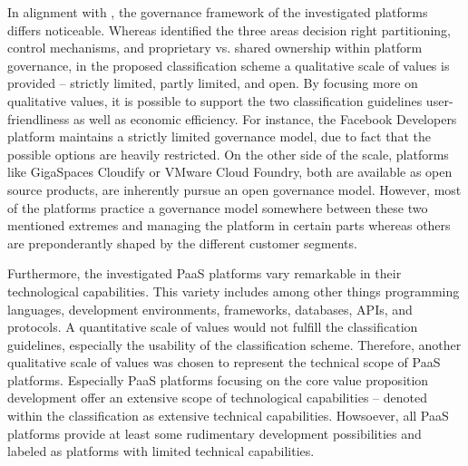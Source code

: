 In alignment with \citet{Tiwana2010}, the governance framework of the investigated platforms differs noticeable. Whereas \citet[pp. 679-681]{Tiwana2010} identified the three areas decision right partitioning, control mechanisms, and proprietary vs. shared ownership within platform governance, in the proposed classification scheme a qualitative scale of values is provided -- strictly limited, partly limited, and open. By focusing more on qualitative values, it is possible to support the two classification guidelines user-friendliness as well as economic efficiency. For instance, the Facebook Developers platform maintains a strictly limited governance model, due to fact that the possible options are heavily restricted. On the other side of the scale, platforms like GigaSpaces Cloudify or VMware Cloud Foundry, both are available as open source products, are inherently pursue an open governance model. However, most of the platforms practice a governance model somewhere between these two mentioned extremes and managing the platform in certain parts whereas others are preponderantly shaped by the different customer segments.

Furthermore, the investigated \ac{PaaS} platforms vary remarkable in their technological capabilities. This variety includes among other things programming languages, development environments, frameworks, databases, \acp{API}, and protocols. A quantitative scale of values would not fulfill the classification guidelines, especially the usability of the classification scheme. Therefore, another qualitative scale of values was chosen to represent the technical scope of \ac{PaaS} platforms. Especially \ac{PaaS} platforms focusing on the core value proposition development offer an extensive scope of technological capabilities -- denoted within the classification as extensive technical capabilities. Howsoever, all \ac{PaaS} platforms provide at least some rudimentary development possibilities and labeled as platforms with limited technical capabilities.

